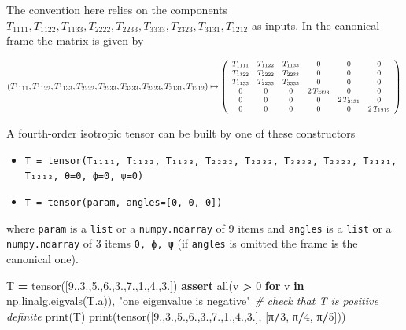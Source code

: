 \documentclass[
  a4paper,
  numbers=noendperiod,
  DIV=12]{scrreprt}
\newenvironment{Shaded}{\begin{snugshade}}{\end{snugshade}}
\newcommand{\BuiltInTok}[1]{#1}
\newcommand{\CommentTok}[1]{\textcolor[rgb]{0.56,0.35,0.01}{\textit{#1}}}
\newcommand{\ControlFlowTok}[1]{\textcolor[rgb]{0.13,0.29,0.53}{\textbf{#1}}}
\newcommand{\DecValTok}[1]{\textcolor[rgb]{0.00,0.00,0.81}{#1}}
\newcommand{\FloatTok}[1]{\textcolor[rgb]{0.00,0.00,0.81}{#1}}
\newcommand{\KeywordTok}[1]{\textcolor[rgb]{0.13,0.29,0.53}{\textbf{#1}}}
\newcommand{\NormalTok}[1]{#1}
\newcommand{\OperatorTok}[1]{\textcolor[rgb]{0.81,0.36,0.00}{\textbf{#1}}}
\newcommand{\StringTok}[1]{\textcolor[rgb]{0.31,0.60,0.02}{#1}}
\providecommand{\tightlist}{%
  \setlength{\itemsep}{0pt}\setlength{\parskip}{0pt}}
\begin{document}
The convention here relies on the components
\(T_{1 1 1 1}, T_{1 1 2 2}, T_{1 1 3 3}, T_{2 2 2 2}, T_{2 2 3 3}, T_{3 3 3 3}, T_{2 3 2 3}, T_{3 1 3 1}, T_{1 2 1 2}\)
as inputs. In the canonical frame the matrix is given by

\[
\small
(T_{1 1 1 1}, T_{1 1 2 2}, T_{1 1 3 3}, T_{2 2 2 2}, T_{2 2 3 3}, T_{3 3 3 3}, T_{2 3 2 3}, T_{3 1 3 1}, T_{1 2 1 2})
\mapsto
\left(
\begin{array}{cccccc}
T_{1 1 1 1} & T_{1 1 2 2} & T_{1 1 3 3} & 0 & 0 & 0 \\
T_{1 1 2 2} & T_{2 2 2 2} & T_{2 2 3 3} & 0 & 0 & 0 \\
T_{1 1 3 3} & T_{2 2 3 3} & T_{3 3 3 3} & 0 & 0 & 0 \\
0 & 0 & 0 & 2 \, T_{2 3 2 3} & 0 & 0 \\
0 & 0 & 0 & 0 & 2 \, T_{3 1 3 1} & 0 \\
0 & 0 & 0 & 0 & 0 & 2 \, T_{1 2 1 2} \\
\end{array}
\right)
\]

A fourth-order isotropic tensor can be built by one of these
constructors

\begin{itemize}
\tightlist
\item
  \texttt{T\ =\ tensor(T₁₁₁₁,\ T₁₁₂₂,\ T₁₁₃₃,\ T₂₂₂₂,\ T₂₂₃₃,\ T₃₃₃₃,\ T₂₃₂₃,\ T₃₁₃₁,\ T₁₂₁₂,\ θ=0,\ ϕ=0,\ ψ=0)}
\item
  \texttt{T\ =\ tensor(param,\ angles={[}0,\ 0,\ 0{]})}
\end{itemize}

where \texttt{param} is a \texttt{list} or a \texttt{numpy.ndarray} of 9
items and \texttt{angles} is a \texttt{list} or a \texttt{numpy.ndarray}
of 3 items \texttt{θ,\ ϕ,\ ψ} (if \texttt{angles} is omitted the frame
is the canonical one).

\begin{Shaded}
\begin{Highlighting}[]
\NormalTok{T }\OperatorTok{=}\NormalTok{ tensor([}\FloatTok{9.}\NormalTok{,}\FloatTok{3.}\NormalTok{,}\FloatTok{5.}\NormalTok{,}\FloatTok{6.}\NormalTok{,}\FloatTok{3.}\NormalTok{,}\FloatTok{7.}\NormalTok{,}\FloatTok{1.}\NormalTok{,}\FloatTok{4.}\NormalTok{,}\FloatTok{3.}\NormalTok{])}
\ControlFlowTok{assert} \BuiltInTok{all}\NormalTok{(v }\OperatorTok{\textgreater{}} \DecValTok{0} \ControlFlowTok{for}\NormalTok{ v }\KeywordTok{in}\NormalTok{ np.linalg.eigvals(T.a)), }\StringTok{"one eigenvalue is negative"} \CommentTok{\# check that T is positive definite}
\BuiltInTok{print}\NormalTok{(T)}
\BuiltInTok{print}\NormalTok{(tensor([}\FloatTok{9.}\NormalTok{,}\FloatTok{3.}\NormalTok{,}\FloatTok{5.}\NormalTok{,}\FloatTok{6.}\NormalTok{,}\FloatTok{3.}\NormalTok{,}\FloatTok{7.}\NormalTok{,}\FloatTok{1.}\NormalTok{,}\FloatTok{4.}\NormalTok{,}\FloatTok{3.}\NormalTok{], [π}\OperatorTok{/}\DecValTok{3}\NormalTok{, π}\OperatorTok{/}\DecValTok{4}\NormalTok{, π}\OperatorTok{/}\DecValTok{5}\NormalTok{]))}
\end{Highlighting}
\end{Shaded}
\end{document}
